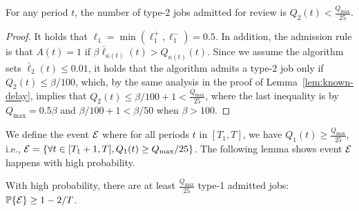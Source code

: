 \begin{lemma}\label{lem:bound-q2}
For any period $t$, the number of type-2 jobs admitted for review is $Q_2(t) < \frac{Q_{\max}}{25}$.
\end{lemma}
\begin{proof}
It holds that $\ell_1 = \min(\ell_1^+, \ell_1^-) = 0.5$. In addition, the admission rule is that $A(t) = 1$ if $\beta \bar{\ell}_{\kappa(t)}(t) > Q_{\kappa(t)}(t)$. Since we assume the algorithm sets $\bar{\ell}_2(t) \leq 0.01$, it holds that the algorithm admits a type-$2$ job only if
$Q_2(t) \leq \beta / 100$, which, by the same analysis in the proof of Lemma~\ref{lem:known-delay}, implies that $Q_2(t) \leq \beta /100 + 1 < \frac{Q_{\max}}{25}$, where the last inequality is by $Q_{\max} = 0.5\beta$ and $\beta / 100 + 1 < \beta / 50$ when $\beta > 100$.
\end{proof}
We define the event $\mathcal{E}$ where for all periods $t$ in $[T_1,T]$, we have $Q_1(t) \geq \frac{Q_{\max}}{25}$, i.e., $\mathcal{E} = \{\forall t \in [T_1+1,T], Q_1(t) \geq Q_{\max}/25\}$. The following lemma shows event $\mathcal{E}$ happens with high probability.
\begin{lemma}\label{lem:prob-event-e}
With high probability, there are at least $\frac{Q_{\max}}{25}$ type-1 admitted jobs:
$\mathbb{P}\{\mathcal{E}\} \geq 1 - 2/T$.
\end{lemma}
